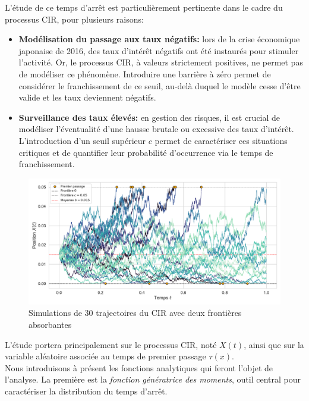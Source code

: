 L'étude de ce temps d'arrêt est particulièrement pertinente dans le cadre du processus \acs{CIR}, pour plusieurs raisons:
\begin{itemize}
    \item \textbf{Modélisation du passage aux taux négatifs:} lors de la crise économique japonaise de 2016, des taux d'intérêt négatifs ont été instaurés pour stimuler l'activité. Or, le processus \acs{CIR}, à valeurs strictement positives, ne permet pas de modéliser ce phénomène. Introduire une barrière à zéro permet de considérer le franchissement de ce seuil, au-delà duquel le modèle cesse d'être valide et les taux deviennent négatifs.
    \item \textbf{Surveillance des taux élevés:} en gestion des risques, il est crucial de modéliser l'éventualité d'une hausse brutale ou excessive des taux d'intérêt. L'introduction d'un seuil supérieur $c$ permet de caractériser ces situations critiques et de quantifier leur probabilité d'occurrence via le temps de franchissement.
\end{itemize}

\begin{figure}[htb]
    \centering
    \includegraphics[width=\linewidth]{img/intro/cir_first_passage.pdf}
    \caption{Simulations de 30 trajectoires du \acs{CIR} avec deux frontières absorbantes}\label{fig:FPTCIR}
\end{figure}
\FloatBarrier L'étude portera principalement sur le processus \acs{CIR}, noté $X(t)$, ainsi que sur la variable aléatoire associée au temps de premier passage $\tau(x)$.\\
Nous introduisons à présent les fonctions analytiques qui feront l'objet de l'analyse. La première est la \textit{fonction génératrice des moments}, outil central pour caractériser la distribution du temps d'arrêt.

